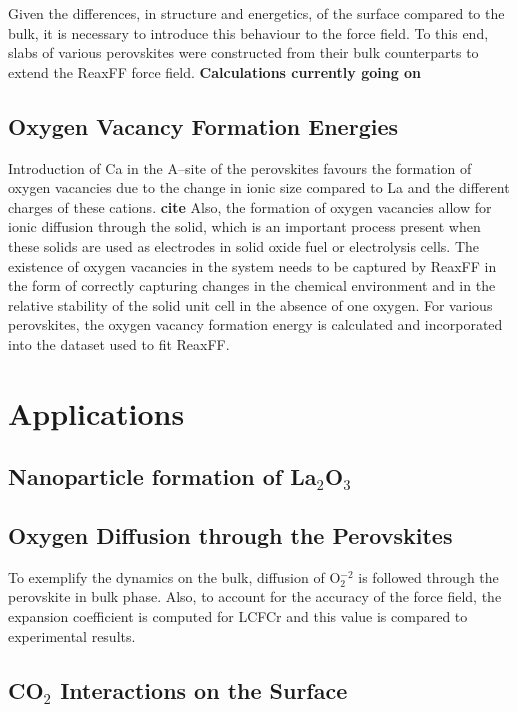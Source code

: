 \documentclass[journal=jpcafh,manuscript=article]{achemso}
\begin{document}
Given the differences, in structure and energetics, of the surface compared to the bulk, it is necessary to introduce this behaviour to the force field.
To this end, slabs of various perovskites were constructed from their bulk counterparts to extend the ReaxFF force field.
\textbf{Calculations currently going on}

\subsection{Oxygen Vacancy Formation Energies}

Introduction of Ca in the A--site of the perovskites favours the formation of oxygen vacancies due to the change in ionic size compared to La and the different charges of these cations. \textbf{cite}
Also, the formation of oxygen vacancies allow for ionic diffusion through the solid, which is an important process present when these solids are used as electrodes in solid oxide fuel or electrolysis cells.
The existence of oxygen vacancies in the system needs to be captured by ReaxFF in the form of correctly capturing changes in the chemical environment and in the relative stability of the solid unit cell in the absence of one oxygen.
For various perovskites, the oxygen vacancy formation energy is calculated and incorporated into the dataset used to fit ReaxFF.

\section{Applications}
\label{sec:applications}

\subsection{Nanoparticle formation of La$_2$O$_3$}



\subsection{Oxygen Diffusion through the Perovskites}

To exemplify the dynamics on the bulk, diffusion of O$_2^{-2}$ is followed through the perovskite in bulk phase.
Also, to account for the accuracy of the force field, the expansion coefficient is computed for LCFCr and this value is compared to experimental results.

\subsection{CO$_2$ Interactions on the Surface}
\end{document}
